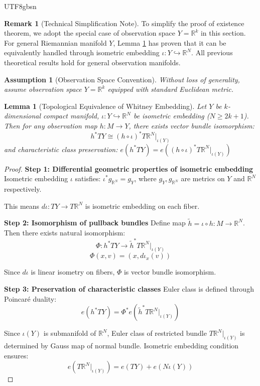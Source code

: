 \documentclass[a4paper,12pt]{extarticle}
\newtheorem{lemma}[theorem]{Lemma}
\newtheorem{assumption}{Assumption}
\theoremstyle{definition}
\newtheorem{remark}{Remark}
\begin{document}
\begin{CJK}{UTF8}{gbsn}
\begin{remark}[Technical Simplification Note]
To simplify the proof of existence theorem, we adopt the special case of observation space $Y = \mathbb{R}^k$ in this section.
For general Riemannian manifold $Y$, Lemma \ref{lem:Whitney_emb} has proven that it can be equivalently handled through isometric embedding $\iota: Y \hookrightarrow \mathbb{R}^N$.
All previous theoretical results hold for general observation manifolds.
\end{remark}

\begin{assumption}[Observation Space Convention]
Without loss of generality, assume observation space $Y = \mathbb{R}^k$ equipped with standard Euclidean metric.
\end{assumption}

\begin{lemma}[Topological Equivalence of Whitney Embedding] \label{lem:Whitney_emb}
Let $Y$ be $k$-dimensional compact manifold, $\iota: Y \hookrightarrow \mathbb{R}^N$ be isometric embedding ($N \geq 2k+1$). Then for any observation map $h: M \to Y$, there exists vector bundle isomorphism:
$$h^*TY \cong (h \circ \iota)^*T\mathbb{R}^N|_{\iota(Y)}$$
and characteristic class preservation: $e(h^*TY) = e((h \circ \iota)^*T\mathbb{R}^N|_{\iota(Y)})$
\end{lemma}

\begin{proof}
\textbf{Step 1: Differential geometric properties of isometric embedding}
Isometric embedding $\iota$ satisfies: $\iota^*g_{\mathbb{R}^N} = g_Y$, where $g_Y, g_{\mathbb{R}^N}$ are metrics on $Y$ and $\mathbb{R}^N$ respectively.

This means $d\iota: TY \to T\mathbb{R}^N$ is isometric embedding on each fiber.

\textbf{Step 2: Isomorphism of pullback bundles}
Define map $\tilde{h} = \iota \circ h: M \to \mathbb{R}^N$. Then there exists natural isomorphism:
$$\Phi: h^*TY \to \tilde{h}^*T\mathbb{R}^N|_{\iota(Y)}$$
$$\Phi(x, v) = (x, d\iota_x(v))$$

Since $d\iota$ is linear isometry on fibers, $\Phi$ is vector bundle isomorphism.

\textbf{Step 3: Preservation of characteristic classes}
Euler class is defined through Poincaré duality:
$$e(h^*TY) = \Phi^*e(\tilde{h}^*T\mathbb{R}^N|_{\iota(Y)})$$

Since $\iota(Y)$ is submanifold of $\mathbb{R}^N$, Euler class of restricted bundle $T\mathbb{R}^N|_{\iota(Y)}$ is determined by Gauss map of normal bundle. Isometric embedding condition ensures:
$$e(T\mathbb{R}^N|_{\iota(Y)}) = e(TY) + e(N\iota(Y))$$


\end{proof}
\end{CJK}
\end{document}
